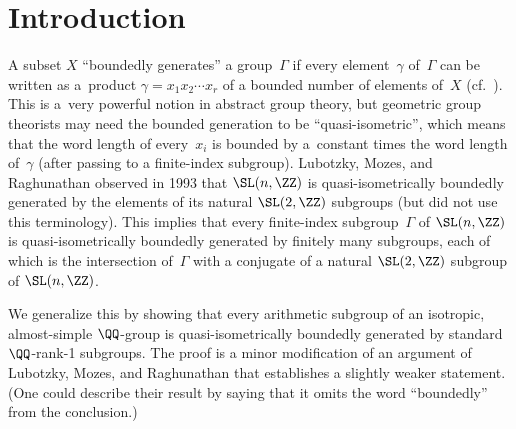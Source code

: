 \section{Introduction} \label{IntroSect}

A subset $X$ ``boundedly generates'' a group~$\Gamma$ if every element~$\gamma$ of~$\Gamma$ can be written as a~product $\gamma = x_1 x_2 \cdots x_r$ of a bounded number of elements of~$X$ (cf.~\cite[p.~203]{MR1278263}). This is a~very powerful notion in abstract group theory, but geometric group theorists may need the bounded generation to be ``quasi-isometric'', which means that the word length of every~$x_i$ is bounded by a~constant times the word length of~$\gamma$ (after passing to a finite-index subgroup). Lubotzky, Mozes, and Raghunathan \cite[Corollary~3]{MR1244421} observed in 1993 that $\SL(n,\ZZ)$ is quasi-isometrically boundedly generated by the elements of its natural $\SL(2,\ZZ)$ subgroups (but did not use this terminology). This implies that every finite-index subgroup~$\Gamma$ of $\SL(n,\ZZ)$ is quasi-isometrically boundedly generated by finitely many subgroups, each of which is the intersection of~$\Gamma$ with a conjugate of a natural $\SL(2,\ZZ)$ subgroup of $\SL(n,\ZZ)$.

We generalize this by showing that every arithmetic subgroup of an isotropic, almost-simple $\QQ$-group is quasi-isometrically boundedly generated by standard $\QQ$-rank-1 subgroups. The proof is a minor modification of an argument of Lubotzky, Mozes, and Raghunathan \cite[Section~4]{MR1828742} that establishes a slightly weaker statement. (One could describe their result by saying that it omits the word ``boundedly'' from the conclusion.)

